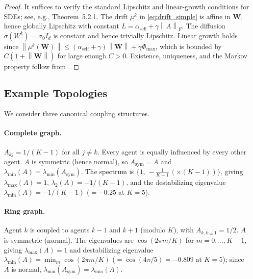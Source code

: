 \documentclass[12pt]{article}
\theoremstyle{plain}
\theoremstyle{definition}
\newcommand{\W}{\mathbf{W}}
\newcommand{\norm}[1]{\left\lVert #1 \right\rVert}
\begin{document}
\begin{proof}
  It suffices to verify the standard Lipschitz and linear-growth
  conditions for SDEs; see, e.g., \cite{oksendal2003sde} Theorem~5.2.1.
  The drift $\mu^k$ in \eqref{eq:drift_simple} is affine in
  $\W$, hence globally Lipschitz with constant
  $L = \alpha_{\mathrm{self}} + \gamma \norm{A}_F$.  The diffusion
  $\sigma(W^k) = \sigma_0 I_d$ is constant and hence trivially Lipschitz.
  Linear growth holds since
  $\norm{\mu^k(\W)} \leq (\alpha_{\mathrm{self}} +
  \gamma)\norm{\W} + \gamma \Phi_{\max}$, which is bounded by
  $C(1 + \norm{\W})$ for large enough $C > 0$.  Existence, uniqueness,
  and the Markov property follow from \cite{oksendal2003sde}.
\end{proof}

\subsection{Example Topologies}
\label{ssec:topologies}

We consider three canonical coupling structures.

\paragraph{Complete graph.}  $A_{kj} = 1/(K-1)$ for all $j \neq k$.
Every agent is equally influenced by every other agent.  $A$ is symmetric
(hence normal), so $A_{\mathrm{sym}}=A$ and $\lambda_{\min}(A)=\lambda_{\min}(A_{\mathrm{sym}})$.
The spectrum is $\{1,\,-\tfrac{1}{K-1}\,(\times(K-1))\}$, giving
$\lambda_{\max}(A) = 1$, $\lambda_2(A) = -1/(K-1)$, and the
destabilizing eigenvalue $\lambda_{\min}(A) = -1/(K-1)$ ($=-0.25$ at $K=5$).

\paragraph{Ring graph.}  Agent $k$ is coupled to agents $k-1$ and $k+1$
(modulo $K$), with $A_{k,k\pm 1} = 1/2$.  $A$ is symmetric (normal).  The
eigenvalues are $\cos(2\pi m / K)$ for $m = 0, \ldots, K-1$, giving
$\lambda_{\max}(A) = 1$ and destabilizing eigenvalue $\lambda_{\min}(A) =
\min_m \cos(2\pi m/K)$ ($=\cos(4\pi/5)=-0.809$ at $K=5$); since $A$ is
normal, $\lambda_{\min}(A_{\mathrm{sym}})=\lambda_{\min}(A)$.
\end{document}
